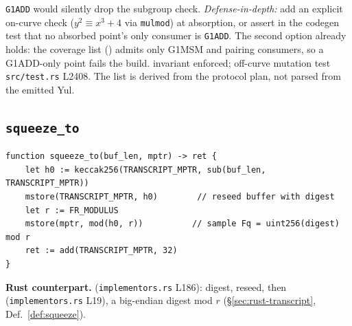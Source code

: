 \begin{itemize}
        \texttt{G1ADD} would silently drop the subgroup check.
        \emph{Defense-in-depth:} add an explicit on-curve check
        ($y^2 \equiv x^3+4$ via \texttt{mulmod}) at absorption, or
        assert in the codegen test that no absorbed point's only
        consumer is \texttt{G1ADD}. The second option already holds:
        the coverage list () admits only
        G1MSM and pairing consumers, so a G1ADD-only point fails the
        build.  invariant enforced; off-curve
        mutation test \texttt{src/test.rs} L2408. The list is derived
        from the protocol plan, not parsed from the emitted Yul.
\end{itemize}

\subsection{\texttt{squeeze\_to}}
\label{sec:squeeze-to}

\begin{lstlisting}[style=yul]
function squeeze_to(buf_len, mptr) -> ret {
    let h0 := keccak256(TRANSCRIPT_MPTR, sub(buf_len, TRANSCRIPT_MPTR))
    mstore(TRANSCRIPT_MPTR, h0)        // reseed buffer with digest
    let r := FR_MODULUS
    mstore(mptr, mod(h0, r))          // sample Fq = uint256(digest) mod r
    ret := add(TRANSCRIPT_MPTR, 32)
}
\end{lstlisting}

\textbf{Rust counterpart.} 
(\texttt{implementors.rs} L186): digest, reseed, then
 (\texttt{implementors.rs}
L19), a big-endian digest mod $r$ (\S\ref{sec:rust-transcript},
Def.~\ref{def:squeeze}).

